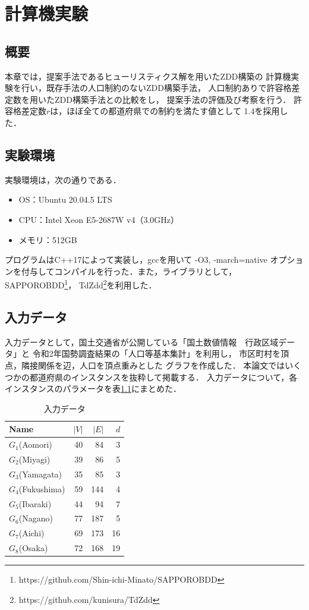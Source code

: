 \chapter{計算機実験} \label{chapter:5}

\section{概要}
本章では，提案手法であるヒューリスティクス解を用いたZDD構築の
計算機実験を行い，既存手法の人口制約のないZDD構築手法，
人口制約ありで許容格差定数を用いたZDD構築手法との比較をし，
提案手法の評価及び考察を行う．
許容格差定数$r$は，ほぼ全ての都道府県での制約を満たす値として
1.4を採用した．

\section{実験環境}
実験環境は，次の通りである．

\begin{itemize}
  \item OS：Ubuntu 20.04.5 LTS
  \item CPU：Intel Xeon E5-2687W v4（3.0GHz）
  \item メモリ：512GB
\end{itemize}

プログラムはC++17によって実装し，gccを用いて -O3, -march=native
オプションを付与してコンパイルを行った．また，ライブラリとして，
SAPPOROBDD\footnote{\scriptsize{https://github.com/Shin-ichi-Minato/SAPPOROBDD}}，
TdZdd\footnote{\scriptsize{https://github.com/kunisura/TdZdd}}を利用した．

\section{入力データ}
入力データとして，国土交通省が公開している「国土数値情報　行政区域データ」と
令和2年国勢調査結果の「人口等基本集計」を利用し，
市区町村を頂点，隣接関係を辺，人口を頂点重みとした
グラフを作成した．
本論文ではいくつかの都道府県のインスタンスを抜粋して掲載する．
入力データについて，各インスタンスのパラメータを表\ref{input_data}にまとめた．

\begin{table}[htbp]
  \caption{入力データ}
  \label{input_data}
  \centering
  \begin{tabular}{l|rrr}
    \hline
    Name & $|V|$ & $|E|$ & $d$ \\
    \hline \hline
    $G_1$(Aomori) & 40 & 84 & 3 \\
    $G_2$(Miyagi) & 39 & 86 & 5 \\
    $G_3$(Yamagata) & 35 & 85 & 3 \\
    $G_4$(Fukushima) & 59 & 144 & 4 \\
    $G_5$(Ibaraki) & 44 & 94 & 7 \\
    $G_6$(Nagano) & 77 & 187 & 5 \\
    $G_7$(Aichi) & 69 & 173 & 16 \\
    $G_8$(Osaka) & 72 & 168 & 19 \\
    \hline
  \end{tabular}
\end{table}

